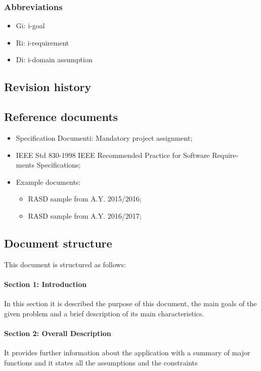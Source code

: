 \documentclass[12pt,titlepage]{article}
\begin{document}
\subsubsection{Abbreviations}\label{RASD}
\begin{itemize}
\item	Gi: i-goal
\item	Ri: i-requirement
\item	Di: i-domain assumption
\end{itemize}
\subsection{Revision history}\label{RASD}

\subsection{Reference documents}\label{RASD}
\begin{itemize}
\item Specification Documenti: Mandatory project assignment;
\item IEEE Std 830-1998 IEEE Recommended Practice for Software Require-
ments Specifications;
\item Example documents: 
\begin{itemize}
\item RASD sample from A.Y. 2015/2016;
\item RASD sample from A.Y. 2016/2017;
\end{itemize}
\end{itemize}

\subsection{Document structure}\label{RASD}
This document is structured as follows:
\paragraph{Section 1: Introduction}
In this section it is described the purpose of this document, the main goals of the given problem and a brief description of its main characteristics. 
\paragraph{Section 2: Overall Description}
It provides further information about the application with a summary of major functions and it states all the assumptions and the constraints 
\end{document}
